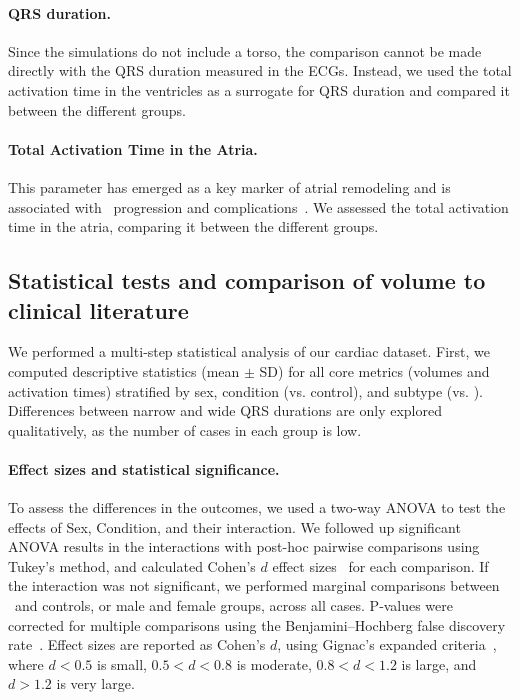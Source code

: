 \paragraph{QRS duration.} 
Since the simulations do not include a torso, the comparison cannot be made directly 
with the QRS duration measured in the ECGs. 
Instead, we used the total activation time in the ventricles as a surrogate 
for QRS duration and compared it between the different groups.

\paragraph{Total Activation Time in the Atria.}
This parameter has emerged as a key marker of atrial remodeling and is associated with \HF\ 
progression and complications~\cite{sanders-2003-atrialremodelling,buck-2008-crt}.
We assessed the total activation time in the atria, comparing it between the different groups.

\subsection{Statistical tests and comparison of volume to clinical literature}
We performed a multi‐step statistical analysis of our cardiac dataset.
First, we computed descriptive statistics (mean $\pm$ SD) for all core metrics (volumes and activation times)
stratified by sex, condition (\HF vs. control), and subtype (\HFN vs. \HFW). 
Differences between narrow and wide QRS durations are only explored qualitatively, as the number 
of cases in each group is low. 

\paragraph{Effect sizes and statistical significance.}
To assess the differences in the outcomes, we used a two-way ANOVA to test the effects of 
Sex, Condition, and their interaction.
We followed up significant ANOVA results in the interactions with post-hoc pairwise comparisons 
using Tukey's method, 
and calculated Cohen's $d$ effect sizes~\cite{cohen-2013-statistical} for each comparison.
If the interaction was not significant, we performed marginal comparisons
between \HF\ and controls, or male and female groups, across all cases.
P‐values were corrected for multiple comparisons using the Benjamini–Hochberg 
false discovery rate~\cite{Benjamini1995ControllingTF}. 
Effect sizes are reported as Cohen's $d$, 
using Gignac's expanded criteria~\cite{gignac-2016-effects},
where $d<0.5$ is small, 
      $0.5<d<0.8$ is moderate, 
      $0.8<d<1.2$ is large, 
  and $d>1.2$ is very large.

